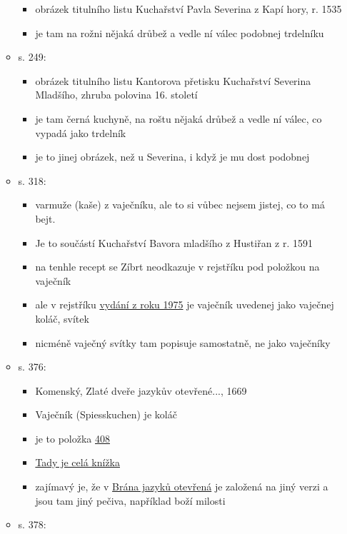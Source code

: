 \begin{itemize}
\begin{itemize}
    \begin{itemize}
    \tightlist
    \item
      obrázek titulního listu Kuchařství Pavla Severina z Kapí hory, r.
      1535
    \item
      je tam na rožni nějaká drůbež a vedle ní válec podobnej trdelníku
    \end{itemize}
  \item
    s. 249:

    \begin{itemize}
    \tightlist
    \item
      obrázek titulního listu Kantorova přetisku Kuchařství Severina
      Mladšího, zhruba polovina 16. století
    \item
      je tam černá kuchyně, na roštu nějaká drůbež a vedle ní válec, co
      vypadá jako trdelník
    \item
      je to jinej obrázek, než u Severina, i když je mu dost podobnej
    \end{itemize}
  \item
    s. 318:

    \begin{itemize}
    \tightlist
    \item
      varmuže (kaše) z vaječníku, ale to si vůbec nejsem jistej, co to
      má bejt.
    \item
      Je to součástí Kuchařství Bavora mladšího z Hustiřan z r. 1591
    \item
      na tenhle recept se Zíbrt neodkazuje v rejstříku pod položkou na
      vaječník
    \item
      ale v rejstříku
      \href{https://ndk.cz/uuid/uuid:27bccb70-88d6-11e3-997d-005056827e52}{vydání
      z roku 1975} je vaječník uvedenej jako vaječnej koláč, svítek
    \item
      nicméně vaječný svítky tam popisuje samostatně, ne jako vaječníky
    \end{itemize}
  \item
    s. 376:

    \begin{itemize}
    \tightlist
    \item
      Komenský, Zlaté dveře jazykův otevřené..., 1669
    \item
      Vaječník (Spiesskuchen) je koláč
    \item
      je to položka
      \href{https://vokabular.ujc.cas.cz/moduly/mluvnice/digitalni-kopie-detail/KomJanua1669/strana-76}{408}
    \item
      \href{https://vokabular.ujc.cas.cz/moduly/mluvnice/digitalni-kopie-info/KomJanua1669}{Tady
      je celá knížka}
    \item
      zajímavý je, že v
      \href{https://www.digitalniknihovna.cz/mzk/view/uuid:c53f79b0-b747-11e4-a7a2-005056827e51?page=uuid:c976bf00-bdcf-11e4-ba2b-5ef3fc9bb22f&fulltext=kol\%C3\%A1\%C4\%8D\%C5\%AF}{Brána
      jazyků otevřená} je založená na jiný verzi a jsou tam jiný pečiva,
      například boží milosti
    \end{itemize}
  \item
    s. 378:


\end{itemize}
\end{itemize}

